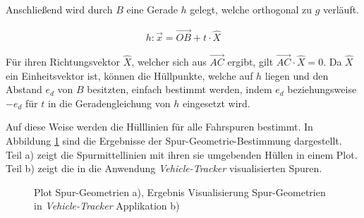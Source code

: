 Anschließend wird durch $B$ eine Gerade $h$ gelegt, welche orthogonal zu $g$ verläuft.

\begin{ceqn}
\begin{align}
    h: \vec{x} = \overrightarrow{OB} + t \cdot \hat{X}
\end{align}
\end{ceqn}

Für ihren Richtungsvektor $\hat{X}$, welcher sich aus $\overrightarrow{AC}$ ergibt, gilt
$\overrightarrow{AC} \cdot \hat{X} = 0$. Da $\hat{X}$ ein Einheitsvektor
ist, können die Hüllpunkte, welche auf $h$ liegen und den Abstand $e_d$ von $B$ besitzten, einfach
bestimmt werden, indem $e_d$ beziehungsweise $-e_d$ für $t$ in die Geradengleichung von $h$ eingesetzt wird.

Auf diese Weise werden die Hülllinien für alle Fahrspuren bestimmt. In Abbildung \ref{fig:real2_results_geometry_definition} sind die
Ergebnisse der Spur-Geometrie-Bestimmung dargestellt. Teil a) zeigt die Spurmittellinien mit ihren
sie umgebenden Hüllen in einem Plot. Teil b) zeigt die in die Anwendung \textit{Vehicle-Tracker} visualisierten Spuren.

\begin{figure}[H]
    \centering
    \caption[Ergebnisse Spur-Geometrie-Bestimmung]
            {Plot Spur-Geometrien a), Ergebnis Visualisierung Spur-Geometrien in \textit{Vehicle-Tracker} Applikation b)}
    \label{fig:real2_results_geometry_definition}
\end{figure}

